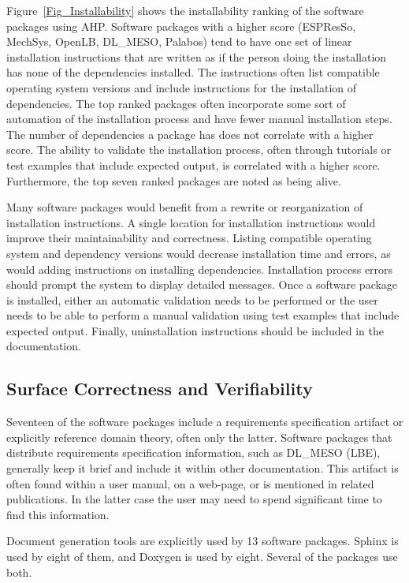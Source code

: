 \documentclass[final, 3p, times, authoryear]{elsarticle}
\begin{document}
Figure~\ref{Fig_Installability} shows the installability ranking of the software
packages using AHP. Software packages with a higher score (ESPResSo, MechSys, OpenLB, DL\_MESO, Palabos) tend to have one set of linear installation instructions that are written as if the person doing the installation has none of the dependencies installed. The instructions often list compatible operating system versions and include instructions for the installation of dependencies. The top ranked packages often incorporate some sort of automation of the installation process and have fewer manual installation steps. The number of dependencies a package has does not correlate with a higher score. The ability to validate the installation process, often through tutorials or test examples that include expected output, is correlated with a higher score. Furthermore, the top seven ranked packages are noted as being alive. 

Many software packages would benefit from a rewrite or reorganization of
installation instructions. A single location for installation instructions would
improve their maintainability and correctness. Listing compatible operating
system and dependency versions would decrease installation time and errors, as
would adding instructions on installing dependencies. Installation process
errors should prompt the system to display detailed messages. Once a software
package is installed, either an automatic validation needs to be performed or
the user needs to be able to perform a manual validation using test examples
that include expected output. Finally, uninstallation instructions should be
included in the documentation. 
 
\subsection{Surface Correctness and Verifiability}

Seventeen of the software packages include a requirements specification artifact
or explicitly reference domain theory, often only the latter. Software packages
that distribute requirements specification information, such as DL\_MESO (LBE),
generally keep it brief and include it within other documentation. This artifact
is often found within a user manual, on a web-page, or is mentioned in related
publications. In the latter case the user may need to spend significant time to
find this information. 

Document generation tools are explicitly used by 13 software packages. Sphinx is
used by eight of them, and Doxygen is used by eight. Several of the packages use
both.
\end{document}
